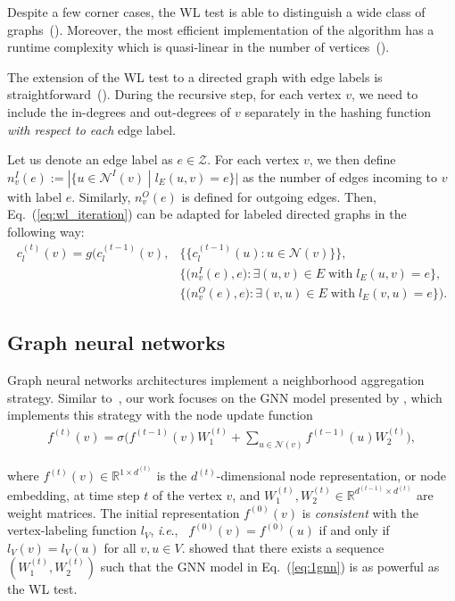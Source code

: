 \documentclass{article} \usepackage{iclr2019_conference,times}
\newcommand{\ie}{\textit{i}.\textit{e}., }
\begin{document}
Despite a few corner cases, the WL test is able to distinguish a wide class of graphs~(\cite{Cai1992}). Moreover, the most efficient implementation of the algorithm has a runtime complexity which is quasi-linear in the number of vertices~(\cite{Grohe2017a}).


The extension of the WL test to a directed graph with edge labels is straightforward~(\cite{Grohe2017a, Orsini2015}). During the recursive step, for each vertex $v$, we need to include  the in-degrees and  out-degrees of $v$ separately in the hashing function \emph{with respect to each} edge label.

Let us denote an edge label as $e \in \mathcal{Z}$. For each vertex $v$, we then define $n^I_v(e) := |\{u \in \mathcal{N}^I(v) \; | \; l_E(u,v) = e\}|$ as the number of edges incoming to $v$ with label $e$. Similarly, $n^O_v(e)$ is defined for outgoing edges. Then,  Eq.~(\ref{eq:wl_iteration}) can be adapted for labeled directed graphs in the following way:
\begin{equation}\label{eq:wl_iteration_dir_edgelabel}
\begin{split}
    c_l^{(t)}(v) = g\Big(c_l^{(t-1)}(v), &\big\{\big\{ c_l^{(t-1)}(u): u \in \mathcal{N}(v) \big\} \big\}, \\ &\big\{ \big(n^I_v(e), e\big): \exists (u,v) \in E\;\mathrm{with}\;l_E(u,v) = e \big\},\\ &\big\{ \big(n^O_v(e), e\big): \exists (v,u) \in E\;\mathrm{with}\;l_E(v,u) = e \big\}\Big).
\end{split}
\end{equation}


\subsection{Graph neural networks}

Graph neural networks architectures implement a neighborhood aggregation strategy. Similar to~\cite{Morris2018}, our work focuses on the GNN model presented by \cite{Hamilton2017}, which implements this strategy with the node update function 
\begin{align}\label{eq:1gnn}
    f^{(t)}(v) = \sigma\Big(f^{(t-1)}(v)W_1^{(t)} + \sum_{u \in \mathcal{N}(v)}f^{(t-1)}(u)W_2^{(t)}\Big),
\end{align}

where $f^{(t)}(v) \in \mathbb{R}^{1 \times d^{(t)}}$ is the $d^{(t)}$-dimensional node representation, or node embedding, at time step $t$ of the vertex $v$, and $W_1^{(t)}, W_2^{(t)} \in \mathbb{R}^{d^{(t-1)}\times d^{(t)}}$ are weight matrices. The initial representation $f^{(0)}(v)$ is \emph{consistent} with the vertex-labeling function $l_V$, \ie~$f^{(0)}(v) = f^{(0)}(u)$ if and only if $l_V(v) = l_V(u)$ for all $v,u \in V$. \cite{Morris2018} showed that there exists a sequence $(W_1^{(t)},W_2^{(t)})$ such that the GNN model in Eq.~(\ref{eq:1gnn}) is as powerful as the WL test.
\end{document}
